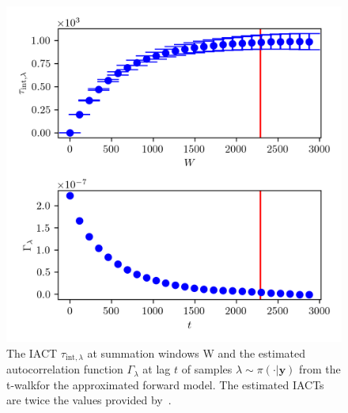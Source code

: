 \begin{figure}[ht!]
	\centering
	\includegraphics{UwerrTauIntTWalk1.png}
	\caption[IACT and autocorrelation function of samples $\lambda \sim \pi(\cdot|\bm{y})$, for approximated model.]{The IACT $\tau_{\text{int},\lambda}$ at summation windows W and the estimated autocorrelation function $\Gamma_{\lambda}$ at lag $t$ of samples $\lambda \sim \pi( \cdot| \bm{y})$ from the t-walkfor the approximated forward model.
	The estimated IACTs are twice the values provided by~\cite{drikHesse, UwerrM}.}
	\label{fig:TWalkIATC2}
\end{figure}



